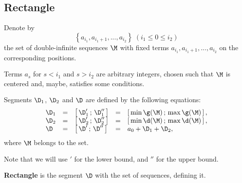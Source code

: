 \subsection{Rectangle}

\begin{designation}
	Denote by
	\begin{equation*}%
		\left\{ a_{i_1}, a_{i_1 + 1}, ..., a_{i_2} \right\}
		\;(i_1 \leqslant 0 \leqslant i_2)
	\end{equation*}
	the set of double-infinite sequences $\M$
	with fixed terms $a_{i_1}, a_{i_1 + 1}, ..., a_{i_2}$
	on the corresponding positions.
	
	Terms $a_s$ for $s < i_1$ and $s > i_2$ are arbitrary integers,
	chosen such that $\M$ is centered and, maybe, satisfies some conditions.
\end{designation}

Segments $\D_1$, $\D_2$ and $\D$
are defined by the following equations:
\begin{equation}\label{deltas}
	\begin{array}{lclcl}
		\D_1 & = & \left[\, \D_1' \,;\, \D_1'' \, \right]
		& = & \left[\, \min\g( \M) \,;\,
		\max\g( \M) \, \right],
		\\
		\D_2 & = & \left[\, \D_2' \,;\, \D_2'' \, \right]
		& = & \left[\, \min\d( \M) \,;\,
		\max\d(\M) \, \right],
		\\
		\D & = & \left[\, \D' \,;\, \D'' \, \right]
		& = & a_0 + \D_1 + \D_2,
	\end{array}
\end{equation}
where $\M$ belongs to the set.

Note that we will use $'$ for the lower bound, and $''$ for the upper bound.

\begin{definition}
	\textbf{Rectangle} is the segment $\D$ with the set of sequences, defining it.
\end{definition}
